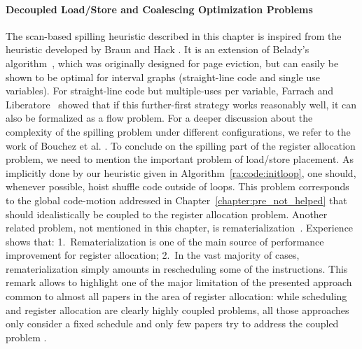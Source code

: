 {\paragraph{Decoupled Load/Store and Coalescing Optimization Problems}
The scan-based spilling heuristic described in this chapter is inspired from the heuristic developed by Braun and Hack \cite{Braun:2009:CC}.
It is an extension of Belady's algorithm~\cite{belady:1966:storage}, which was originally designed for page eviction, but can easily be shown to be optimal for interval graphs (straight-line code and single use variables).
For straight-line code but multiple-uses per variable, Farrach and Liberatore~\cite{farach:98:local} showed that if this further-first strategy works reasonably well, it can also be formalized as a flow problem.
For a deeper discussion about the complexity of the spilling problem under different configurations, we refer to the work of Bouchez et al. \cite{Bouchez07b}.
To conclude on the spilling part of the register allocation problem, we need to mention the important problem of load/store placement.
As implicitly done by our heuristic given in Algorithm~\ref{ra:code:initloop}, one should, whenever possible, hoist shuffle code outside of loops.
This problem corresponds to the global code-motion addressed in Chapter~\ref{chapter:pre_not_helped} that should idealistically be coupled to the register allocation problem.
Another related problem, not mentioned in this chapter, is rematerialization~\cite{rematerialization}.
Experience shows that:
1.~Rematerialization is one of the main source of performance improvement for register allocation;
2.~In the vast majority of cases, rematerialization simply amounts in rescheduling some of the instructions.
This remark allows to highlight one of the major limitation of the presented approach common to almost all papers in the area of register allocation:
while scheduling and register allocation are clearly highly coupled problems, all those approaches only consider a fixed schedule and only few papers try to address the coupled problem \cite{norris1993scheduler,Pinter:1993:RAI,Wang:1994:SPR,Motwani:1995:CRA,Berson:1998:IIS,Codina:2001:UMS,touati,Rawat:2018:ROS}.

}
